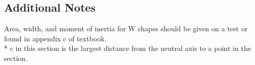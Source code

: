 \documentclass[10pt,landscape]{article}
\newenvironment{Figure}
     {\par\medskip\noindent\minipage{\linewidth}}
     {\endminipage\par\medskip}
\begin{document}
\begin{multicols}{3}
\subsection{Additional Notes}
Area, width, and moment of inertia for W shapes should be given on a test or found in appendix c of textbook.\\*
c in this section is the largest distance from the neutral axis to a point in the section.


%
%

\end{multicols}
\end{document}
